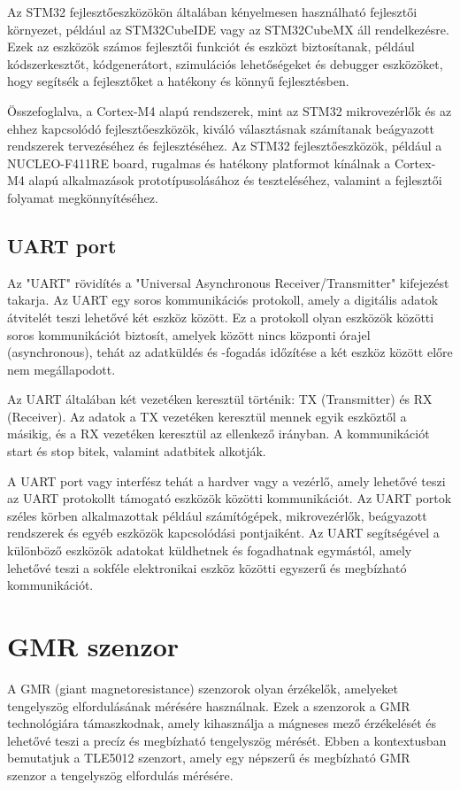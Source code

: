 Az STM32 fejlesztőeszközökön általában kényelmesen használható fejlesztői környezet, például az STM32CubeIDE vagy az STM32CubeMX áll rendelkezésre. Ezek az eszközök számos fejlesztői funkciót és eszközt biztosítanak, például kódszerkesztőt, kódgenerátort, szimulációs lehetőségeket és debugger eszközöket, hogy segítsék a fejlesztőket a hatékony és könnyű fejlesztésben.

Összefoglalva, a Cortex-M4 alapú rendszerek, mint az STM32 mikrovezérlők és az ehhez kapcsolódó fejlesztőeszközök, kiváló választásnak számítanak beágyazott rendszerek tervezéséhez és fejlesztéséhez. Az STM32 fejlesztőeszközök, például a NUCLEO-F411RE board, rugalmas és hatékony platformot kínálnak a Cortex-M4 alapú alkalmazások prototípusolásához és teszteléséhez, valamint a fejlesztői folyamat megkönnyítéséhez.

\subsection{UART port}
Az "UART" rövidítés a "Universal Asynchronous Receiver/Transmitter" kifejezést takarja. Az UART egy soros kommunikációs protokoll, amely a digitális adatok átvitelét teszi lehetővé két eszköz között. Ez a protokoll olyan eszközök közötti soros kommunikációt biztosít, amelyek között nincs központi órajel (asynchronous), tehát az adatküldés és -fogadás időzítése a két eszköz között előre nem megállapodott.

Az UART általában két vezetéken keresztül történik: TX (Transmitter) és RX (Receiver). Az adatok a TX vezetéken keresztül mennek egyik eszköztől a másikig, és a RX vezetéken keresztül az ellenkező irányban. A kommunikációt start és stop bitek, valamint adatbitek alkotják.

A UART port vagy interfész tehát a hardver vagy a vezérlő, amely lehetővé teszi az UART protokollt támogató eszközök közötti kommunikációt. Az UART portok széles körben alkalmazottak például számítógépek, mikrovezérlők, beágyazott rendszerek és egyéb eszközök kapcsolódási pontjaiként. Az UART segítségével a különböző eszközök adatokat küldhetnek és fogadhatnak egymástól, amely lehetővé teszi a sokféle elektronikai eszköz közötti egyszerű és megbízható kommunikációt.

\section{GMR szenzor}
A GMR (giant magnetoresistance) szenzorok olyan érzékelők, amelyeket tengelyszög elfordulásának mérésére használnak. Ezek a szenzorok a GMR technológiára támaszkodnak, amely kihasználja a mágneses mező érzékelését és lehetővé teszi a precíz és megbízható tengelyszög mérését. Ebben a kontextusban bemutatjuk a TLE5012 szenzort, amely egy népszerű és megbízható GMR szenzor a tengelyszög elfordulás mérésére.


